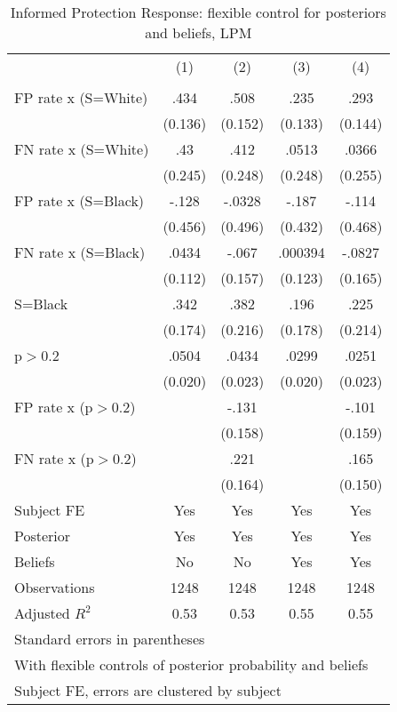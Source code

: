 \begin{table}[htbp]\centering
\caption{Informed Protection Response: flexible control for posteriors and beliefs, LPM}
\begin{tabular}{l*{4}{c}}
\hline\hline
                &\multicolumn{1}{c}{(1)}&\multicolumn{1}{c}{(2)}&\multicolumn{1}{c}{(3)}&\multicolumn{1}{c}{(4)}\\
                &\multicolumn{1}{c}{}&\multicolumn{1}{c}{}&\multicolumn{1}{c}{}&\multicolumn{1}{c}{}\\
\hline
FP rate x (S=White)&     .434&     .508&     .235&     .293\\
                &  (0.136)&  (0.152)&  (0.133)&  (0.144)\\
FN rate x (S=White)&      .43&     .412&    .0513&    .0366\\
                &  (0.245)&  (0.248)&  (0.248)&  (0.255)\\
FP rate x (S=Black)&    -.128&   -.0328&    -.187&    -.114\\
                &  (0.456)&  (0.496)&  (0.432)&  (0.468)\\
FN rate x (S=Black)&    .0434&    -.067&  .000394&   -.0827\\
                &  (0.112)&  (0.157)&  (0.123)&  (0.165)\\
S=Black         &     .342&     .382&     .196&     .225\\
                &  (0.174)&  (0.216)&  (0.178)&  (0.214)\\
p$>$0.2         &    .0504&    .0434&    .0299&    .0251\\
                &  (0.020)&  (0.023)&  (0.020)&  (0.023)\\
FP rate x (p$>$0.2)&         &    -.131&         &    -.101\\
                &         &  (0.158)&         &  (0.159)\\
FN rate x (p$>$0.2)&         &     .221&         &     .165\\
                &         &  (0.164)&         &  (0.150)\\
Subject FE      &      Yes&      Yes&      Yes&      Yes\\
Posterior       &      Yes&      Yes&      Yes&      Yes\\
Beliefs         &       No&       No&      Yes&      Yes\\
\hline
Observations    &     1248&     1248&     1248&     1248\\
Adjusted \(R^{2}\)&     0.53&     0.53&     0.55&     0.55\\
\hline\hline
\multicolumn{5}{l}{\footnotesize Standard errors in parentheses}\\
\multicolumn{5}{l}{\footnotesize With flexible controls of posterior probability and beliefs}\\
\multicolumn{5}{l}{\footnotesize Subject FE, errors are clustered by subject}\\
\end{tabular}
\end{table}
